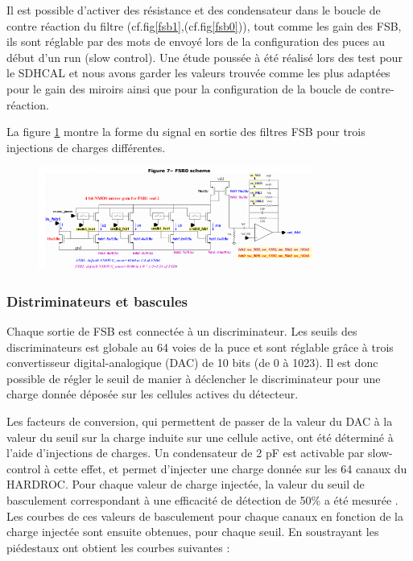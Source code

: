 Il est possible d'activer des résistance et des condensateur dans le boucle de contre réaction du filtre (cf.fig\ref{fsb1},(cf.fig\ref{fsb0})), tout comme les gain des FSB, ils sont réglable par des mots de envoyé lors de la configuration des puces au début d'un run (slow control). Une étude poussée à été réalisé lors des test pour le SDHCAL et nous avons garder les valeurs trouvée comme les plus adaptées pour le gain des miroirs ainsi que pour la configuration de la boucle de contre-réaction.

La figure \ref{signal} montre la forme du signal en sortie des filtres FSB pour trois injections de charges différentes.
\begin{figure}[ht!]
	\centering
	\includegraphics[width=0.8\textwidth]{GLA/FSB1.png}
	\label{signal}
\end{figure}

\subsubsection{Distriminateurs et bascules}
Chaque sortie de FSB est connectée à un discriminateur. Les seuils des discriminateurs est globale au 64 voies de la puce et sont réglable grâce à trois convertisseur digital-analogique (DAC) de 10 bits (de 0 à 1023). Il est donc possible de régler le seuil de manier à déclencher le discriminateur pour une charge donnée déposée sur les cellules actives du détecteur.

Les facteurs de conversion, qui permettent de passer de la valeur du DAC à la valeur du seuil sur la charge induite sur une cellule active, ont été déterminé à l'aide d'injections de charges. Un condensateur de 2 pF est activable par slow-control à cette effet, et permet d'injecter une charge donnée sur les 64 canaux du HARDROC. Pour chaque valeur de charge injectée, la valeur du seuil de basculement correspondant à une efficacité de détection de 50\% a été mesurée \cite{kieffer:tel-00751999}. Les courbes de ces valeurs de basculement pour chaque canaux en fonction de la charge injectée sont ensuite obtenues, pour chaque seuil. En soustrayant les piédestaux ont obtient les courbes suivantes :


